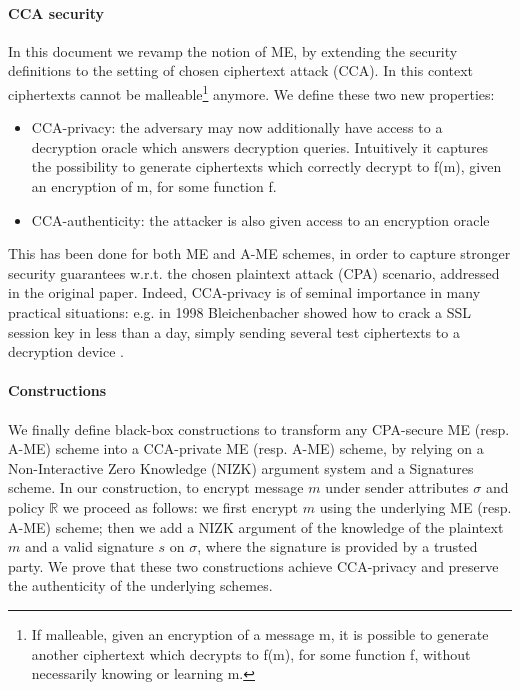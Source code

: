 \paragraph{CCA security}
In this document we revamp the notion of ME, by extending the security definitions to the setting of chosen ciphertext attack (CCA).
In this context ciphertexts cannot be malleable\footnote{If malleable, given an encryption of a message m, it is possible to generate another ciphertext which decrypts to f(m), for some function f, without necessarily knowing or learning m.} anymore. We define these two new properties:
\begin{itemize}
    \item CCA-privacy: the adversary may now additionally have access to a decryption oracle which answers decryption queries. Intuitively it captures the possibility to generate ciphertexts which correctly decrypt to f(m), given an encryption of m, for some function f.
    \item CCA-authenticity: the attacker is also given access to an encryption oracle
\end{itemize}
This has been done for both ME and A-ME schemes, in order to capture stronger security guarantees w.r.t. the chosen plaintext attack (CPA) scenario, addressed in the original paper.
Indeed, CCA-privacy is of seminal importance in many practical situations: e.g. in 1998 Bleichenbacher showed how to crack a SSL session key in less than a day, simply sending several test ciphertexts to a decryption device \cite{Bleichenbacher}.

\paragraph{Constructions}
We finally define black-box constructions to transform any CPA-secure ME (resp. A-ME) scheme into a CCA-private ME (resp. A-ME) scheme, by relying on a Non-Interactive Zero Knowledge (NIZK) argument system and a Signatures scheme.
\newline
In our construction, to encrypt message $m$ under sender attributes $\sigma$ and policy $\mathbb{R}$ we proceed as follows: we first encrypt $m$ using the underlying ME (resp. A-ME) scheme; then we add a NIZK argument of the knowledge of the plaintext $m$ and a valid signature $s$ on $\sigma$, where the signature is provided by a trusted party.
\newline
We prove that these two constructions achieve CCA-privacy and preserve the authenticity of the underlying schemes.
